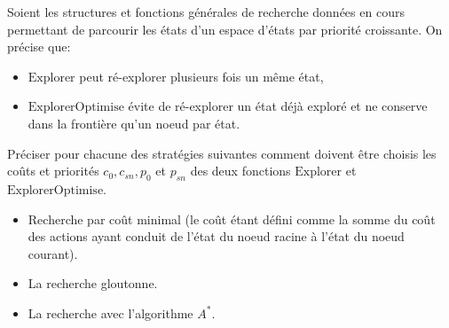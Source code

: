 Soient les structures et fonctions générales de recherche données en cours
permettant de parcourir les états d'un espace d'états par priorité croissante.
On précise que:
\begin{itemize}
	\item \(\text{Explorer}\) peut ré-explorer plusieurs fois un même état,
	\item \(\text{ExplorerOptimise}\) évite de ré-explorer un état déjà exploré
	et ne conserve dans la frontière qu'un noeud par état.
\end{itemize}


\begin{td-exo}[] %
	Préciser pour chacune des stratégies suivantes comment doivent être
	choisis les coûts et priorités \(c_0, c_{sn},p_0\) et \(p_{sn}\) des 
	deux fonctions \(\text{Explorer}\) et \(\text{ExplorerOptimise}\).
	\begin{itemize}
		\item Recherche par coût minimal (le coût étant défini
		comme la somme du coût des actions ayant conduit de l'état
		du noeud racine à l'état du noeud courant).

		\item La recherche gloutonne.

		\item La recherche avec l'algorithme \(A^\ast\).
	\end{itemize}
\end{td-exo}

